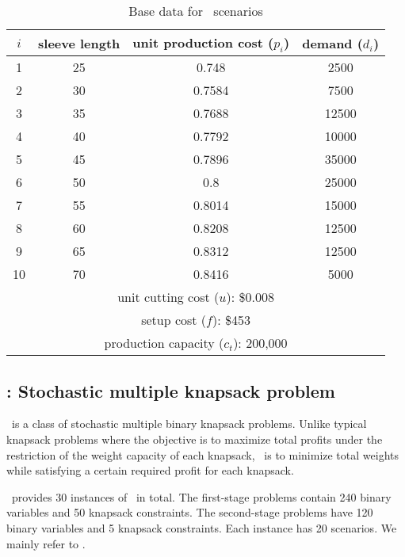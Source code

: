 \begin{table}[]
	\centering
	\caption{Base data for \sizes\ scenarios \cite{journal:JSW1999}}
	\label{sizes:data}
	\begin{tabular}{cccc}
		\hline
		$i$  & sleeve length & unit production cost ($p_i$) & demand ($d_i$) \\ \hline
		1  & 25            & 0.748                & 2500   \\
		2  & 30            & 0.7584               & 7500   \\
		3  & 35            & 0.7688               & 12500  \\
		4  & 40            & 0.7792               & 10000  \\
		5  & 45            & 0.7896               & 35000  \\
		6  & 50            & 0.8                  & 25000  \\
		7  & 55            & 0.8014               & 15000  \\
		8  & 60            & 0.8208               & 12500  \\
		9  & 65            & 0.8312               & 12500  \\
		10 & 70            & 0.8416               & 5000   \\ \hline
		\multicolumn{4}{c}{unit cutting cost ($u$): \$0.008}     \\
		\multicolumn{4}{c}{setup cost ($f$): \$453}              \\ 
		\multicolumn{4}{c}{production capacity ($c_t$): 200,000} \\ \hline
	\end{tabular}
\end{table}

\subsection{\smkp: Stochastic multiple knapsack problem} \label{SMKP}
\smkp\ is a class of stochastic multiple binary knapsack problems. Unlike typical knapsack problems where the objective is to maximize total profits under the restriction of the weight capacity of each knapsack, \smkp\ is to minimize total weights while satisfying a certain required profit for each knapsack. 

\siplib\ provides 30 instances of \smkp\ in total. The first-stage problems contain 240 binary variables and 50 knapsack constraints. The second-stage problems have 120 binary variables and 5 knapsack constraints. Each instance has 20 scenarios. 
We mainly refer to \cite{journal:AAD2014}.%

